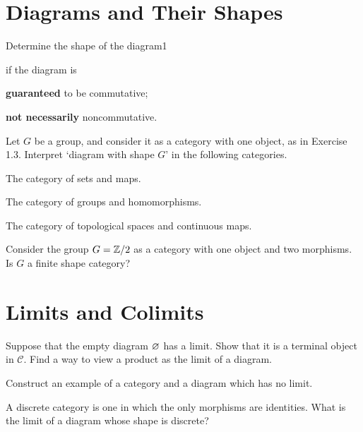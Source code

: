 
\section{Diagrams and Their Shapes}

\bx
Determine the shape of the diagram1
\bse
{}
\ese
if the diagram is
\ben[label=(\alph*)]
\item \textbf{guaranteed} to be commutative;
\item \textbf{not necessarily} noncommutative.
\een 
\ex

\bs
\ben[label=(\alph*)]
\item  
\item 
\een
\es

\bx
Let $G$ be a group, and consider it as a category with one object, as in Exercise 1.3. Interpret `diagram with shape $G$' in the following categories.
\ben[label=(\alph*)]
\item  The category of sets and maps.
\item The category of groups and homomorphisms.
\item The category of topological spaces and continuous maps.
\een
\ex

\bs
\ben[label=(\alph*)]
\item  
\item
\item 
\een
\es

\bx
Consider the group $G = \mathbb{Z}/2$ as a category with one object and two morphisms. Is $G$ a finite shape category?
\ex

\bs
\es

\section{Limits and Colimits}

\bx
Suppose that the empty diagram $\varnothing$ has a limit. Show that it is a terminal object in $\mathcal{C}$. Find a way to view a product as the limit of a diagram.
\ex

\bs
\es

\bx
\ben[label=(\alph*)]
\item Construct an example of a category and a diagram which has no limit.
\item A discrete category is one in which the only morphisms are identities. What is the limit of a diagram whose shape is discrete?
\een
\ex

